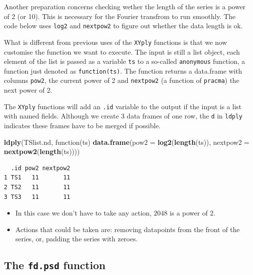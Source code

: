 \documentclass[]{book}
\newenvironment{Shaded}{\begin{snugshade}}{\end{snugshade}}
\newcommand{\KeywordTok}[1]{\textcolor[rgb]{0.13,0.29,0.53}{\textbf{{#1}}}}
\newcommand{\DataTypeTok}[1]{\textcolor[rgb]{0.13,0.29,0.53}{{#1}}}
\newcommand{\NormalTok}[1]{{#1}}
\providecommand{\tightlist}{%
  \setlength{\itemsep}{0pt}\setlength{\parskip}{0pt}}
\begin{document}
Another preparation concerns checking wether the length of the series is
a power of 2 (or 10). This is necessary for the Fourier transfrom to run
smoothly. The code below uses \texttt{log2} and \texttt{nextpow2} to
figure out whether the data length is ok.

What is different from previous uses of the \texttt{XYply} functions is
that we now customise the function we want to execute. The input is
still a list object, each element of the list is passed as a variable
\texttt{ts} to a so-called \texttt{anonymous} function, a function just
denoted as \texttt{function(ts)}. The function returns a data.frame with
columns \texttt{pow2}, the current power of 2 and \texttt{nextpow2} (a
function of \texttt{pracma}) the next power of 2.

The \texttt{XYply} functions will add an \texttt{.id} variable to the
output if the input is a list with named fields. Although we create 3
data frames of one row, the \texttt{d} in \texttt{ldply} indicates these
frames have to be merged if possible.

\begin{Shaded}
\begin{Highlighting}[]
\KeywordTok{ldply}\NormalTok{(TSlist.nd, function(ts) }\KeywordTok{data.frame}\NormalTok{(}\DataTypeTok{pow2 =} \KeywordTok{log2}\NormalTok{(}\KeywordTok{length}\NormalTok{(ts)), }\DataTypeTok{nextpow2 =} \KeywordTok{nextpow2}\NormalTok{(}\KeywordTok{length}\NormalTok{(ts))))}
\end{Highlighting}
\end{Shaded}

\begin{verbatim}
  .id pow2 nextpow2
1 TS1   11       11
2 TS2   11       11
3 TS3   11       11
\end{verbatim}

\begin{itemize}
\tightlist
\item
  In this case we don't have to take any action, \(2048\) is a power of
  2.
\item
  Actions that could be taken are: removing datapoints from the front of
  the series, or, padding the series with zeroes.
\end{itemize}

\subsection{\texorpdfstring{The \texttt{fd.psd}
function}{The fd.psd function}}\label{the-fd.psd-function}
\end{document}
